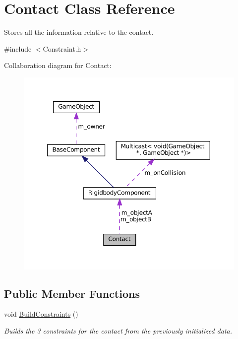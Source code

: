 \hypertarget{classContact}{}\section{Contact Class Reference}
\label{classContact}


Stores all the information relative to the contact.  




{\ttfamily \#include $<$Constraint.\+h$>$}



Collaboration diagram for Contact\+:
\nopagebreak
\begin{figure}[H]
\begin{center}
\leavevmode
\includegraphics[width=350pt]{classContact__coll__graph}
\end{center}
\end{figure}
\subsection*{Public Member Functions}
\begin{DoxyCompactItemize}
\item 
\mbox{\label{classContact_a1af30adc27b3cc1b971dcfe01959f9e9}} 
void \hyperlink{classContact_a1af30adc27b3cc1b971dcfe01959f9e9}{Build\+Constraints} ()
\begin{DoxyCompactList}\small\item\em Builds the 3 constraints for the contact from the previously initialized data. \end{DoxyCompactList}\end{DoxyCompactItemize}
